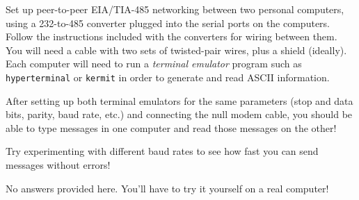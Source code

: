 

Set up peer-to-peer EIA/TIA-485 networking between two personal computers, using a 232-to-485 converter plugged into the serial ports on the computers.  Follow the instructions included with the converters for wiring between them.  You will need a cable with two sets of twisted-pair wires, plus a shield (ideally).  Each computer will need to run a {\it terminal emulator} program such as {\tt hyperterminal} or {\tt kermit} in order to generate and read ASCII information.

After setting up both terminal emulators for the same parameters (stop and data bits, parity, baud rate, etc.) and connecting the null modem cable, you should be able to type messages in one computer and read those messages on the other!

Try experimenting with different baud rates to see how fast you can send messages without errors!







No answers provided here.  You'll have to try it yourself on a real computer!











